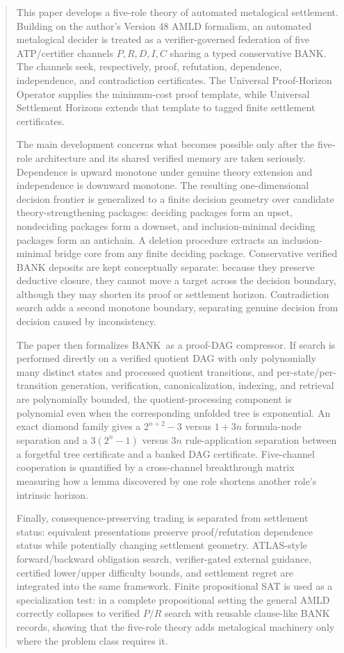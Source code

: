 \documentclass[11pt]{article}
\theoremstyle{remark}
\newcommand{\BANK}{\ensuremath{\mathrm{BANK}}}
\begin{document}
\begin{abstract}
This paper develops a five-role theory of automated metalogical settlement. Building on the author's Version 48 AMLD formalism, an automated metalogical decider is treated as a verifier-governed federation of five ATP/certifier channels $P,R,D,I,C$ sharing a typed conservative \BANK. The channels seek, respectively, proof, refutation, dependence, independence, and contradiction certificates. The Universal Proof-Horizon Operator supplies the minimum-cost proof template, while Universal Settlement Horizons extends that template to tagged finite settlement certificates.

The main development concerns what becomes possible only after the five-role architecture and its shared verified memory are taken seriously. Dependence is upward monotone under genuine theory extension and independence is downward monotone. The resulting one-dimensional decision frontier is generalized to a finite decision geometry over candidate theory-strengthening packages: deciding packages form an upset, nondeciding packages form a downset, and inclusion-minimal deciding packages form an antichain. A deletion procedure extracts an inclusion-minimal bridge core from any finite deciding package. Conservative verified BANK deposits are kept conceptually separate: because they preserve deductive closure, they cannot move a target across the decision boundary, although they may shorten its proof or settlement horizon. Contradiction search adds a second monotone boundary, separating genuine decision from decision caused by inconsistency.

The paper then formalizes \BANK\ as a proof-DAG compressor. If search is performed directly on a verified quotient DAG with only polynomially many distinct states and processed quotient transitions, and per-state/per-transition generation, verification, canonicalization, indexing, and retrieval are polynomially bounded, the quotient-processing component is polynomial even when the corresponding unfolded tree is exponential. An exact diamond family gives a $2^{n+2}-3$ versus $1+3n$ formula-node separation and a $3(2^n-1)$ versus $3n$ rule-application separation between a forgetful tree certificate and a banked DAG certificate. Five-channel cooperation is quantified by a cross-channel breakthrough matrix measuring how a lemma discovered by one role shortens another role's intrinsic horizon.

Finally, consequence-preserving trading is separated from settlement status: equivalent presentations preserve proof/refutation dependence status while potentially changing settlement geometry. ATLAS-style forward/backward obligation search, verifier-gated external guidance, certified lower/upper difficulty bounds, and settlement regret are integrated into the same framework. Finite propositional SAT is used as a specialization test: in a complete propositional setting the general AMLD correctly collapses to verified $P/R$ search with reusable clause-like BANK records, showing that the five-role theory adds metalogical machinery only where the problem class requires it.
\end{abstract}
\end{document}
